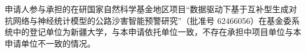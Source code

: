 \justifying
\NSFCBodyText

申请人参与承担的在研国家自然科学基金地区项目“数据驱动下基于互补型生成对抗网络与神经统计模型的公路沙害智能预警研究”（批准号 62466056）在基金委系统中的登记单位为新疆大学，与本申请依托单位一致，不存在承担中项目单位与本申请单位不一致的情况。
